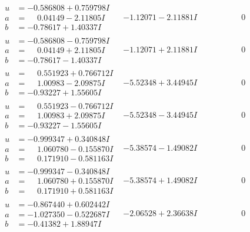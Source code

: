 \documentclass[1p]{elsarticle_modified}
\theoremstyle{definition}
\begin{document}
$$\begin{array}{c|c|c}
\begin{aligned}
u &= -0.586808 + 0.759798 I \\
a &= \phantom{-}0.04149 - 2.11805 I \\
b &= -0.78617 + 1.40337 I\end{aligned}
 & -1.12071 - 2.11881 I & \phantom{-0.000000 } 0 \\ \hline\begin{aligned}
u &= -0.586808 - 0.759798 I \\
a &= \phantom{-}0.04149 + 2.11805 I \\
b &= -0.78617 - 1.40337 I\end{aligned}
 & -1.12071 + 2.11881 I & \phantom{-0.000000 } 0 \\ \hline\begin{aligned}
u &= \phantom{-}0.551923 + 0.766712 I \\
a &= \phantom{-}1.00983 - 2.09875 I \\
b &= -0.93227 + 1.55605 I\end{aligned}
 & -5.52348 + 3.44945 I & \phantom{-0.000000 } 0 \\ \hline\begin{aligned}
u &= \phantom{-}0.551923 - 0.766712 I \\
a &= \phantom{-}1.00983 + 2.09875 I \\
b &= -0.93227 - 1.55605 I\end{aligned}
 & -5.52348 - 3.44945 I & \phantom{-0.000000 } 0 \\ \hline\begin{aligned}
u &= -0.999347 + 0.340848 I \\
a &= \phantom{-}1.060780 - 0.155870 I \\
b &= \phantom{-}0.171910 - 0.581163 I\end{aligned}
 & -5.38574 - 1.49082 I & \phantom{-0.000000 } 0 \\ \hline\begin{aligned}
u &= -0.999347 - 0.340848 I \\
a &= \phantom{-}1.060780 + 0.155870 I \\
b &= \phantom{-}0.171910 + 0.581163 I\end{aligned}
 & -5.38574 + 1.49082 I & \phantom{-0.000000 } 0 \\ \hline\begin{aligned}
u &= -0.867440 + 0.602442 I \\
a &= -1.027350 - 0.522687 I \\
b &= -0.41382 + 1.88947 I\end{aligned}
 & -2.06528 + 2.36638 I & \phantom{-0.000000 } 0 \\ \hline\begin{aligned}

\end{aligned}
\end{array}$$
\end{document}
